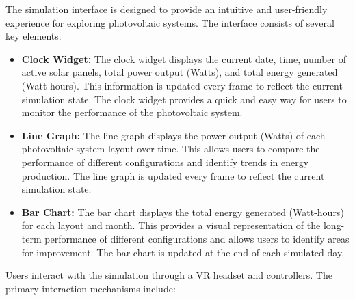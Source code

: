 \documentclass[draft, final]{vutinfth} %
\begin{document}
The simulation interface is designed to provide an intuitive and user-friendly experience for exploring photovoltaic systems. The interface consists of several key elements:

\begin{itemize}
    \item \textbf{Clock Widget:} The clock widget displays the current date, time, number of active solar panels, total power output (Watts), and total energy generated (Watt-hours). This information is updated every frame to reflect the current simulation state. The clock widget provides a quick and easy way for users to monitor the performance of the photovoltaic system.
    \item \textbf{Line Graph:} The line graph displays the power output (Watts) of each photovoltaic system layout over time. This allows users to compare the performance of different configurations and identify trends in energy production. The line graph is updated every frame to reflect the current simulation state.
    \item \textbf{Bar Chart:} The bar chart displays the total energy generated (Watt-hours) for each layout and month. This provides a visual representation of the long-term performance of different configurations and allows users to identify areas for improvement. The bar chart is updated at the end of each simulated day.
\end{itemize}

Users interact with the simulation through a VR headset and controllers. The primary interaction mechanisms include:
\end{document}
